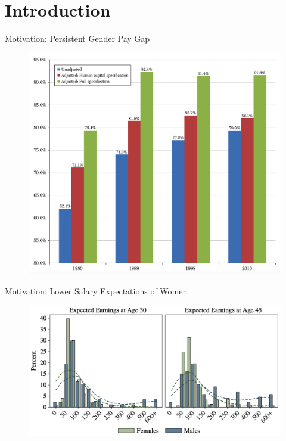 \section{Introduction}
\frame{\sectionpage}

\begin{frame}{Motivation: Persistent Gender Pay Gap}

    \begin{figure}
        \centering
        \includegraphics[height = 0.7 \textheight]{images/mot1.png}
        
        {\small \citet[Figure 2]{blau2017gender}}
    \end{figure}

\end{frame}

\begin{frame}{Motivation: Lower Salary Expectations of Women}

    \begin{figure}
        \centering
        \includegraphics[height = 0.7 \textheight]{images/mot2.png}

        {\small \citet[Figure 1]{reuben2017preferences}}
    \end{figure}

\end{frame}

